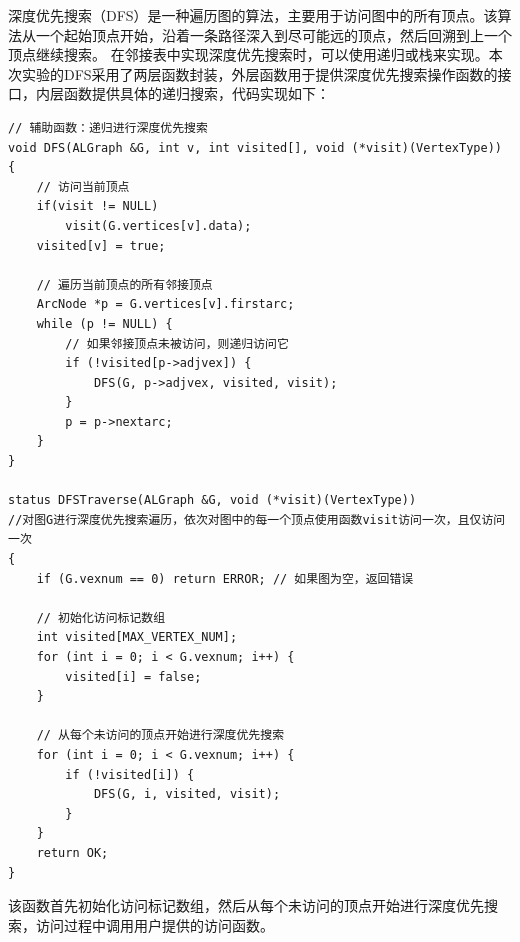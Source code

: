 \documentclass[supercite]{Experimental_Report}
\theoremstyle{definition}
\begin{document}
	深度优先搜索（DFS）是一种遍历图的算法，主要用于访问图中的所有顶点。该算法从一个起始顶点开始，沿着一条路径深入到尽可能远的顶点，然后回溯到上一个顶点继续搜索。
	在邻接表中实现深度优先搜索时，可以使用递归或栈来实现。本次实验的DFS采用了两层函数封装，外层函数用于提供深度优先搜索操作函数的接口，内层函数提供具体的递归搜索，代码实现如下：
\begin{lstlisting}[caption={深度优先搜索}, label=lst:dfs]
	// 辅助函数：递归进行深度优先搜索
void DFS(ALGraph &G, int v, int visited[], void (*visit)(VertexType)) {
    // 访问当前顶点
    if(visit != NULL)
        visit(G.vertices[v].data);
    visited[v] = true;
    
    // 遍历当前顶点的所有邻接顶点
    ArcNode *p = G.vertices[v].firstarc;
    while (p != NULL) {
        // 如果邻接顶点未被访问，则递归访问它
        if (!visited[p->adjvex]) {
            DFS(G, p->adjvex, visited, visit);
        }
        p = p->nextarc;
    }
}

status DFSTraverse(ALGraph &G, void (*visit)(VertexType))
//对图G进行深度优先搜索遍历，依次对图中的每一个顶点使用函数visit访问一次，且仅访问一次
{
    if (G.vexnum == 0) return ERROR; // 如果图为空，返回错误
    
    // 初始化访问标记数组
    int visited[MAX_VERTEX_NUM];
    for (int i = 0; i < G.vexnum; i++) {
        visited[i] = false;
    }
    
    // 从每个未访问的顶点开始进行深度优先搜索
    for (int i = 0; i < G.vexnum; i++) {
        if (!visited[i]) {
            DFS(G, i, visited, visit);
        }
    }
    return OK;
}
\end{lstlisting}
	该函数首先初始化访问标记数组，然后从每个未访问的顶点开始进行深度优先搜索，访问过程中调用用户提供的访问函数。
\end{document}
